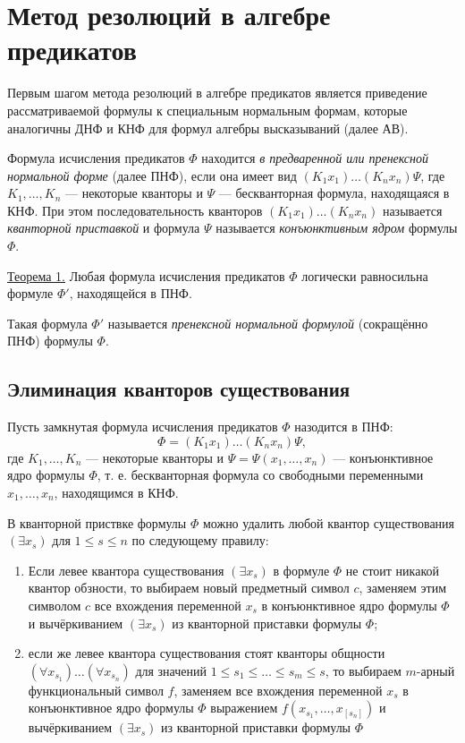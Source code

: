\documentclass{article}
\begin{document}
\section{Метод резолюций в алгебре предикатов}
Первым шагом метода резолюций в алгебре предикатов является приведение рассматриваемой формулы к специальным нормальным формам, которые аналогичны ДНФ и КНФ для формул алгебры высказываний (далее АВ).

Формула исчисления предикатов $\Phi$ находится {\it в предваренной или пренексной нормальной форме} (далее ПНФ), если она имеет вид $(K_1 x_1)\dots(K_n x_n)\Psi$, где $K_1,\dots,K_n$ --- некоторые кванторы и $\Psi$ --- бескванторная формула, находящаяся в КНФ. При этом последовательность кванторов $(K_1 x_1)\dots(K_n x_n)$ называется {\it кванторной приставкой} и формула $\Psi$ называется {\it конъюнктивным ядром} формулы $\Phi$.

\underline{Теорема 1.} Любая формула исчисления предикатов $\Phi$ логически равносильна формуле $\Phi'$, находящейся в ПНФ.

Такая формула $\Phi'$ называется {\it пренексной нормальной формулой} (сокращённо ПНФ) формулы $\Phi$.

\subsection{Элиминация кванторов существования}

Пусть замкнутая формула исчисления предикатов $\Phi$ назодится в ПНФ:
\begin{equation*}
    \Phi = (K_1 x_1)\dots(K_n x_n)\Psi,
\end{equation*}
где $K_1,\dots,K_n$ --- некоторые кванторы и $\Psi = \Psi(x_1,\dots,x_n)$ --- конъюнктивное ядро формулы $\Phi$, т. е. бескванторная формула со свободными переменными $x_1,\dots,x_n$, находящимся в КНФ.

В кванторной приствке формулы $\Phi$ можно удалить любой квантор существования $(\exists x_s)$ для $1 \leq s \leq n$ по следующему правилу:
\begin{enumerate}
    \item Если левее квантора существования $(\exists x_s)$ в формуле $\Phi$ не стоит никакой квантор обзности, то выбираем новый предметный символ $c$, заменяем этим символом $c$ все вхождения переменной $x_s$ в конъюнктивное ядро формулы $\Phi$ и вычёркиванием $(\exists x_s)$ из кванторной приставки формулы $\Phi$;
    \item если же левее квантора существования стоят кванторы общности $(\forall x_{s_1})\dots(\forall x_{s_n})$ для значений $1 \leq s_1 \leq \dots \leq s_m \leq s$, то выбираем $m$-арный функциональный символ $f$, заменяем все вхождения переменной $x_s$ в конъюнктивное ядро формулы $\Phi$ выражением $f(x_{s_1},\dots,x_[s_n])$ и вычёркиванием $(\exists x_s)$ из кванторной приставки формулы $\Phi$
\end{enumerate}
\end{document}
